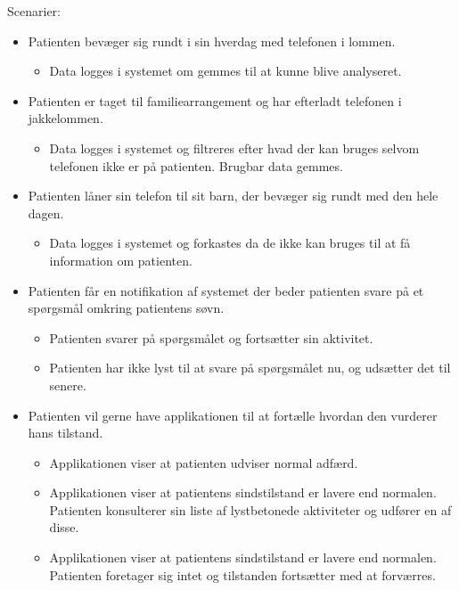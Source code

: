 Scenarier:
\begin{itemize}
	\item Patienten bevæger sig rundt i sin hverdag med telefonen i lommen. 
	\begin{itemize}
		\item Data logges i systemet om gemmes til at kunne blive analyseret.
	\end{itemize}
	
	\item Patienten er taget til familiearrangement og har efterladt telefonen i jakkelommen.
	\begin{itemize}
		\item Data logges i systemet og filtreres efter hvad der kan bruges selvom telefonen ikke er på patienten.
		Brugbar data gemmes.
	\end{itemize}
	
	\item Patienten låner sin telefon til sit barn, der bevæger sig rundt med den hele dagen.
	\begin{itemize}
		\item Data logges i systemet og forkastes da de ikke kan bruges til at få information om patienten.
	\end{itemize}
	
	\item Patienten får en notifikation af systemet der beder patienten svare på et spørgsmål omkring patientens søvn.
	\begin{itemize}
		\item Patienten svarer på spørgsmålet og fortsætter sin aktivitet.
		\item Patienten har ikke lyst til at svare på spørgsmålet nu, og udsætter det til senere.
	\end{itemize}
	
	\item Patienten vil gerne have applikationen til at fortælle hvordan den vurderer hans tilstand.
	\begin{itemize}
		\item Applikationen viser at patienten udviser normal adfærd.
		\item Applikationen viser at patientens sindstilstand er lavere end normalen. Patienten konsulterer sin liste af lystbetonede aktiviteter og udfører en af disse.
		\item Applikationen viser at patientens sindstilstand er lavere end normalen. Patienten foretager sig intet og tilstanden fortsætter med at forværres.
	\end{itemize}

\end{itemize}

